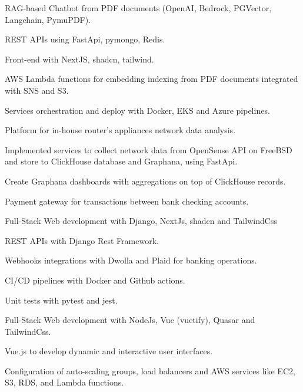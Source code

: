 \documentclass[]{deedy-resume-reversed}
\begin{document}
\begin{minipage}[t]{0.6\textwidth}
\begin{tightemize}
\item RAG-based Chatbot from PDF documents (OpenAI, Bedrock, PGVector, Langchain, PymuPDF).
\item REST APIs using FastApi, pymongo, Redis.
\item Front-end with NextJS, shadcn, tailwind.
\item AWS Lambda functions for embedding indexing from PDF documents integrated with SNS and S3. 
\item Services orchestration and deploy with Docker, EKS and Azure pipelines.
\end{tightemize}
\sectionsep

\begin{tightemize}
\item Platform for in-house router's appliances network data analysis.
\item Implemented services to collect network data from OpenSense API on FreeBSD and store to ClickHouse database and Graphana, using FastApi.
\item Create Graphana dashboards with aggregations on top of ClickHouse records.
\end{tightemize}
\sectionsep

\begin{tightemize}
\item Payment gateway for transactions between bank checking accounts.
\item Full-Stack Web development with Django, NextJs, shadcn and TailwindCss
\item REST APIs with Django Rest Framework.
\item Webhooks integrations with Dwolla and Plaid for banking operations.
\item CI/CD pipelines with Docker and Github actions.
\item Unit tests with pytest and jest.
\end{tightemize}
\sectionsep

\begin{tightemize}
\item Full-Stack Web development with NodeJs, Vue (vuetify), Quasar and TailwindCss.
\item Vue.js to develop dynamic and interactive user interfaces.
\item Configuration of auto-scaling groups, load balancers and AWS services like EC2, S3, RDS, and Lambda functions.
\end{tightemize}
\sectionsep



%
%

\end{minipage}
\end{document}
